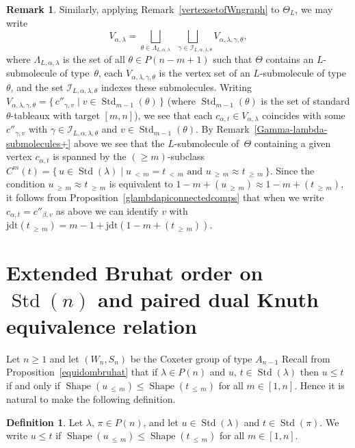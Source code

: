 \documentclass[10pt]{amsart}
\theoremstyle{definition}
\newtheorem{defi}[theo]{Definition}
\newtheorem{rema}[theo]{Remark}
\newcommand{\lessthan}[2]{#1\,{_{<\,#2}}}
\newcommand{\Lessthan}[2]{#1\,{_{\leqslant\,#2}}}
\newcommand{\Morethan}[2]{#1\,{_{\geqslant\,#2}}}
\newcommand{\jdt}{\mathrm{jdt}}
\DeclareMathOperator{\STD}{Std}
\DeclareMathOperator{\shape}{Shape}
\begin{document}
\begin{rema}
Similarly, applying Remark~\ref{vertexsetofWngraph} to $\Theta_L$,
we may write
\[
V_{\alpha,\lambda}=\bigsqcup_{\theta\in\Lambda_{L,\alpha,\lambda}}
\bigsqcup_{\,\,\,\,\gamma\in\mathcal{I}_{L,\alpha,\lambda,\theta}\!\!\!\!}\!\!V_{\alpha,\lambda,\gamma,\theta},
\]
where $\Lambda_{L,\alpha,\lambda}$ is the set of all $\theta\in P(n-m+1)$ such
that $\Theta$ contains an $L$-submolecule of type~$\theta$, each
$V_{\alpha,\lambda,\gamma,\theta}$ is the vertex set of an $L$-submolecule
of type~$\theta$, and the set $\mathcal I_{L,\alpha,\lambda,\theta}$ indexes
these submolecules. Writing
$V_{\alpha,\lambda,\gamma,\theta}=\{\,c''_{\gamma,v}\mid v\in\STD_{m-1}(\theta)\,\}$
(where $\STD_{m-1}(\theta)$ is the set of standard $\theta$-tableaux with target
$[m,n]$), we see that each $c_{\alpha,t}\in V_{\alpha,\lambda}$ coincides
with some $c''_{\gamma,v}$ with $\gamma\in\mathcal I_{L,\alpha,\lambda,\theta}$
and $v\in\STD_{m-1}(\theta)$.
By Remark~\ref{Gamma-lambda-submolecules+} above we see that the
$L$-submolecule of~$\Theta$ containing a given vertex $c_{\alpha,t}$ is
spanned by the $(\geqslant m)$-subclass
$C^m(t) = \{\,u\in\STD(\lambda) \mid\lessthan um = \lessthan tm
\text{ and } \Morethan um\approx \Morethan tm\,\}$.
Since the condition $\Morethan um\approx\Morethan tm$ is equivalent to
$1-m + (\Morethan um)\approx 1-m+ (\Morethan tm)$, it follows from
Proposition~\ref{glambdapiconnectedcomps} that
when we write $c_{\alpha,t}=c''_{\beta,v}$
as above we can identify $v$ with~$\jdt(\Morethan tm)=m-1+\jdt(1-m+(\Morethan tm))$.
\end{rema}

\section{Extended Bruhat order on \texorpdfstring{$\STD(n)$}{Std(n)} and paired dual Knuth equivalence relation}
\label{sec:8}

Let $n\geqslant 1$ and let $(W_n,S_n)$ be the Coxeter group of type $A_{n-1}$
Recall from Proposition~\ref{equidombruhat}
that if $\lambda\in P(n)$ and $u,\,t\in\STD(\lambda)$ then $u\leqslant t$
if and only if $\shape(\Lessthan um) \leqslant \shape(\Lessthan tm)$ for all $m\in [1,n]$.
Hence it is natural to make the following definition.

\begin{defi}\label{ExtDominance Order Tableaux}
Let $\lambda,\,\pi\in P(n)$, and let $u\in\STD(\lambda)$ and $t\in\STD(\pi)$.
We write $u \leqslant t$ if $\shape(\Lessthan um) \leqslant
\shape(\Lessthan tm)$ for all $m\in [1,n]$.
\end{defi}
\end{document}

